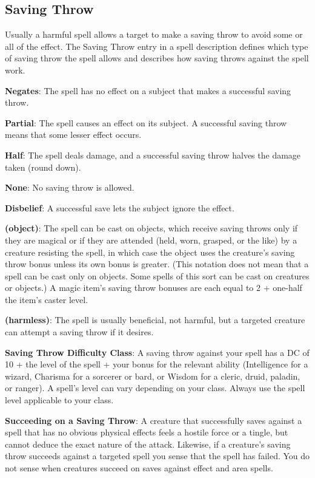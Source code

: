 \subsection{Saving Throw}
Usually a harmful spell allows a target to make a saving throw to avoid some or all of the effect. The Saving Throw entry in a spell description defines which type of saving throw the spell allows and describes how saving throws against the spell work.

\textbf{Negates}: The spell has no effect on a subject that makes a successful saving throw.

\textbf{Partial}: The spell causes an effect on its subject. A successful saving throw means that some lesser effect occurs.

\textbf{Half}: The spell deals damage, and a successful saving throw halves the damage taken (round down).

\textbf{None}: No saving throw is allowed.

\textbf{Disbelief}: A successful save lets the subject ignore the effect.

\textbf{(object)}: The spell can be cast on objects, which receive saving throws only if they are magical or if they are attended (held, worn, grasped, or the like) by a creature resisting the spell, in which case the object uses the creature's saving throw bonus unless its own bonus is greater. (This notation does not mean that a spell can be cast only on objects. Some spells of this sort can be cast on creatures or objects.) A magic item's saving throw bonuses are each equal to 2 + one-half the item's caster level.

\textbf{(harmless)}: The spell is usually beneficial, not harmful, but a targeted creature can attempt a saving throw if it desires.

\textbf{Saving Throw Difficulty Class}: A saving throw against your spell has a DC of 10 + the level of the spell + your bonus for the relevant ability (Intelligence for a wizard, Charisma for a sorcerer or bard, or Wisdom for a cleric, druid, paladin, or ranger). A spell's level can vary depending on your class. Always use the spell level applicable to your class.

\textbf{Succeeding on a Saving Throw}: A creature that successfully saves against a spell that has no obvious physical effects feels a hostile force or a tingle, but cannot deduce the exact nature of the attack. Likewise, if a creature's saving throw succeeds against a targeted spell you sense that the spell has failed. You do not sense when creatures succeed on saves against effect and area spells.

